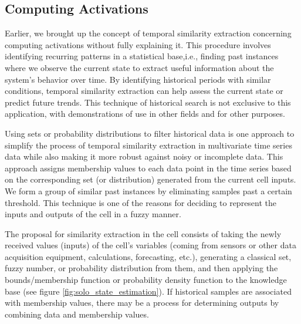 \subsection{Computing Activations} \label{subsec:tempsim}

Earlier, we brought up the concept of temporal similarity extraction concerning computing activations without fully explaining it. This procedure involves identifying recurring patterns in a statistical base,i.e., finding past instances where we observe the current state to extract useful information about the system's behavior over time. By identifying historical periods with similar conditions, temporal similarity extraction can help assess the current state or predict future trends. This technique of historical search is not exclusive to this application, with demonstrations of use in other fields and for other purposes.

Using sets or probability distributions to filter historical data is one approach to simplify the process of temporal similarity extraction in multivariate time series data while also making it more robust against noisy or incomplete data. This approach assigns membership values to each data point in the time series based on the corresponding set (or distribution) generated from the current cell inputs. We form a group of similar past instances by eliminating samples past a certain threshold. This technique is one of the reasons for deciding to represent the inputs and outputs of the cell in a fuzzy manner.

The proposal for similarity extraction in the cell consists of taking the newly received values (inputs) of the cell's variables (coming from sensors or other data acquisition equipment, calculations, forecasting, etc.), generating a classical set, fuzzy number, or probability distribution from them, and then applying the bounds/membership function or probability density function to the knowledge base (see figure \ref{fig:solo_state_estimation}). If historical samples are associated with membership values, there may be a process for determining outputs by combining data and membership values.

